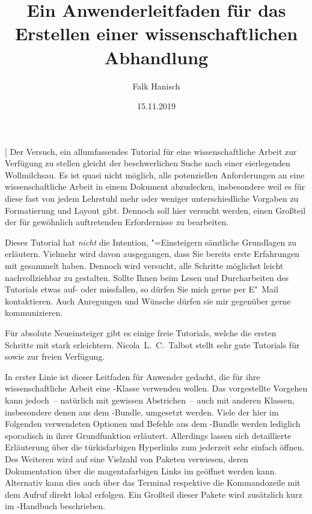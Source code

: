 \documentclass[%
  english,ngerman,%
  cdgeometry=no,DIV=12,%
  automark,%
  listof=toc,%
]{tudscrartcl}
\begin{document}
\title{%
  Ein Anwenderleitfaden für das Erstellen einer wissenschaftlichen Abhandlung%
}
\author{Falk Hanisch\TUDScriptContactNote}
\date{15.11.2019}

\makeatletter
\begingroup%
  \def\and{, }%
  \let\thanks\@gobble%
  \let\footnote\@gobble%
\endgroup%
\makeatother

\StartTutorial[%
  Der Versuch, ein allumfassendes Tutorial für eine wissenschaftliche Arbeit 
  zur Verfügung zu stellen gleicht der beschwerlichen Suche nach einer 
  eierlegenden Wollmilchsau. Es ist quasi nicht möglich, alle potenziellen 
  Anforderungen an eine wissenschaftliche Arbeit in einem Dokument abzudecken, 
  insbesondere weil es für diese fast von jedem Lehrstuhl mehr oder weniger 
  unterschiedliche Vorgaben zu Formatierung und Layout gibt. Dennoch soll hier 
  versucht werden, einen Großteil der für gewöhnlich auftretenden Erfordernisse
  zu bearbeiten.
  
  Dieses Tutorial hat \emph{nicht} die Intention, "=Einsteigern 
  sämtliche Grundlagen zu erläutern. Vielmehr wird davon ausgegangen, dass Sie 
  bereits erste Erfahrungen mit  gesammelt haben. Dennoch wird 
  versucht, alle Schritte möglichst leicht nachvollziehbar zu gestalten. Sollte 
  Ihnen beim Lesen und Durcharbeiten des Tutorials etwas auf- oder missfallen, 
  so dürfen Sie mich gerne per E"~Mail kontaktieren. Auch Anregungen und 
  Wünsche dürfen sie mir gegenüber gerne kommunizieren.
  
  Für absolute Neueinsteiger gibt es einige freie Tutorials, welche die ersten 
  Schritte mit  stark erleichtern. Nicola~L.~C.~Talbot stellt 
  sehr gute Tutorials für 
  \cite{talbot2012} sowie 
  \cite{talbot2013} zur freien Verfügung.
  
  In erster Linie ist dieser Leitfaden für Anwender gedacht, die für ihre
  wissenschaftliche Arbeit eine \TUDScript-Klasse verwenden wollen. Das 
  vorgestellte Vorgehen kann jedoch~-- natürlich mit gewissen Abstrichen~-- 
  auch mit anderen Klassen, insbesondere denen aus dem \KOMAScript-Bundle, 
  umgesetzt werden. Viele der hier im Folgenden verwendeten Optionen und
  Befehle aus dem \TUDScript-Bundle werden lediglich sporadisch in ihrer 
  Grundfunktion erläutert. Allerdings lassen sich detaillierte Erläuterung 
  über die türkisfarbigen Hyperlinks zum   
  jederzeit sehr einfach öffnen. Des Weiteren wird auf eine Vielzahl von 
  Paketen verwiesen, deren Dokumentation über die magentafarbigen Links im 
  \CTAN* geöffnet werden kann. Alternativ kann dies auch über das Terminal 
  respektive die Kommandozeile mit dem Aufruf  
  direkt lokal erfolgen. Ein Großteil dieser Pakete wird zusätzlich kurz im 
  \TUDScript-Handbuch beschrieben.
  
\end{document}
